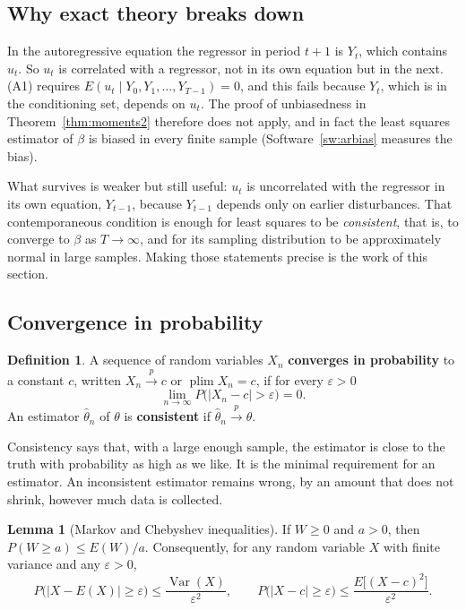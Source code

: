 \documentclass[11pt,a4paper]{article}
\numberwithin{equation}{section}
\DeclareMathOperator{\Var}{Var}
\DeclareMathOperator{\plim}{plim}
\theoremstyle{definition}
\newtheorem{defn}[thm]{Definition}
\newtheorem{lem}[thm]{Lemma}
\begin{document}
\subsection{Why exact theory breaks down}
\label{ssec:whyasym}

In the autoregressive equation the regressor in period $t + 1$ is $Y_t$, which contains $u_t$. So $u_t$ is correlated with a regressor, not in
its own equation but in the next. (A1) requires $E(u_t \mid Y_0, Y_1, \dots, Y_{T-1}) = 0$, and this fails because $Y_t$, which is in the
conditioning set, depends on $u_t$. The proof of unbiasedness in Theorem~\ref{thm:moments2} therefore does not apply, and in fact the least
squares estimator of $\beta$ is biased in every finite sample (Software~\ref{sw:arbias} measures the bias).

What survives is weaker but still useful: $u_t$ is uncorrelated with the regressor in its own equation, $Y_{t-1}$, because $Y_{t-1}$ depends
only on earlier disturbances. That contemporaneous condition is enough for least squares to be \emph{consistent}, that is, to converge to $\beta$
as $T \to \infty$, and for its sampling distribution to be approximately normal in large samples. Making those statements precise is the work of
this section.

\subsection{Convergence in probability}
\label{ssec:plim}

\begin{defn}
A sequence of random variables $X_n$ \textbf{converges in probability} to a constant $c$, written $X_n \xrightarrow{p} c$ or $\plim X_n = c$, if for
every $\varepsilon > 0$
\[
\lim_{n\to\infty} P\bigl(|X_n - c| > \varepsilon\bigr) = 0 .
\]
An estimator $\hat\theta_n$ of $\theta$ is \textbf{consistent} if $\hat\theta_n \xrightarrow{p} \theta$.
\end{defn}

Consistency says that, with a large enough sample, the estimator is close to the truth with probability as high as we like. It is the minimal
requirement for an estimator. An inconsistent estimator remains wrong, by an amount that does not shrink, however much data is collected.

\begin{lem}[Markov and Chebyshev inequalities]
\label{lem:cheb}
If $W \geq 0$ and $a > 0$, then $P(W \geq a) \leq E(W)/a$. Consequently, for any random variable $X$ with finite variance and any $\varepsilon > 0$,
\[
P\bigl(|X - E(X)| \geq \varepsilon\bigr) \leq \frac{\Var(X)}{\varepsilon^2}, \qquad
P\bigl(|X - c| \geq \varepsilon\bigr) \leq \frac{E\bigl[(X - c)^2\bigr]}{\varepsilon^2} .
\]
\end{lem}
\end{document}
